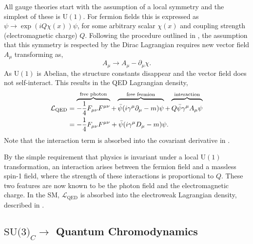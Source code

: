 All gauge theories start with the assumption of a local symmetry and the simplest of these is $\text{U}(1)$.
For fermion fields this is expressed as $\psi \rightarrow \exp{\left(i Q \chi(x)\right)} \psi$, for some arbitrary scalar $\chi(x)$ and coupling strength (electromagnetic charge) $Q$.
Following the procedure outlined in , the assumption that this symmetry is respected by the Dirac Lagrangian requires new vector field $A_\mu$ transforming as,
\begin{equation}
    \label{eq:photon_transformation}
    A_\mu \rightarrow A_\mu - \partial_\mu \chi.
\end{equation}
As $\text{U}(1)$ is Abelian, the structure constants disappear and the vector field does not self-interact.
This results in the \Gls{QED} Lagrangian density,
\begin{align}
    \mathcal{L}_\text{QED} & = \overbrace{-\frac{1}{4} F_{\mu\nu} F^{\mu\nu}}^{\text{free photon}}
    + \overbrace{\vphantom{\frac{1}{1}}\bar \psi (i \gamma^\mu \partial_\mu - m) \psi}^{\text{free fermion}}
    + \overbrace{\vphantom{\frac{1}{1}}Q \bar \psi \gamma^\mu A_\mu \psi}^{\text{interaction}}               \\
                           & = -\frac{1}{4} F_{\mu\nu} F^{\mu\nu} + \bar \psi (i \gamma^\mu D_\mu - m) \psi.
    \label{eq:qed_lagrangian}
\end{align}
Note that the interaction term is absorbed into the covariant derivative in .

By the simple requirement that physics is invariant under a local $\text{U}(1)$ transformation, an interaction arises between the fermion field and a massless spin-1 field, where the strength of these interactions is proportional to $Q$.
These two features are now known to be the photon field and the electromagnetic charge.
In the \Gls{SM}, $\mathcal{L}_\text{QED}$ is absorbed into the electroweak Lagrangian density, described in .

\subsection{\texorpdfstring{$\text{SU(3)}_C\rightarrow$}{SU(3)-} Quantum Chromodynamics}
\label{sec:qcd}

